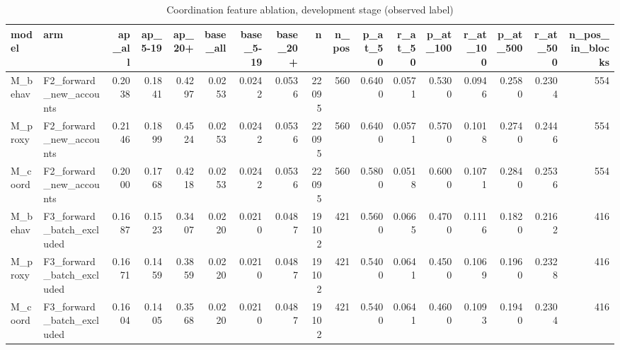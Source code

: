 \begin{table}
\caption{Coordination feature ablation, development stage (observed label)}
\label{tab:tab_coord_ablation}
\begin{tabular}{llrrrrrrrrrrrrrrr}
\toprule
model & arm & ap\_all & ap\_5-19 & ap\_20+ & base\_all & base\_5-19 & base\_20+ & n & n\_pos & p\_at\_50 & r\_at\_50 & p\_at\_100 & r\_at\_100 & p\_at\_500 & r\_at\_500 & n\_pos\_in\_blocks \\
\midrule
M\_behav & F2\_forward\_new\_accounts & 0.2038 & 0.1841 & 0.4297 & 0.0253 & 0.0242 & 0.0536 & 22095 & 560 & 0.6400 & 0.0571 & 0.5300 & 0.0946 & 0.2580 & 0.2304 & 554 \\
M\_proxy & F2\_forward\_new\_accounts & 0.2146 & 0.1899 & 0.4524 & 0.0253 & 0.0242 & 0.0536 & 22095 & 560 & 0.6400 & 0.0571 & 0.5700 & 0.1018 & 0.2740 & 0.2446 & 554 \\
M\_coord & F2\_forward\_new\_accounts & 0.2000 & 0.1768 & 0.4218 & 0.0253 & 0.0242 & 0.0536 & 22095 & 560 & 0.5800 & 0.0518 & 0.6000 & 0.1071 & 0.2840 & 0.2536 & 554 \\
M\_behav & F3\_forward\_batch\_excluded & 0.1687 & 0.1523 & 0.3407 & 0.0220 & 0.0210 & 0.0487 & 19102 & 421 & 0.5600 & 0.0665 & 0.4700 & 0.1116 & 0.1820 & 0.2162 & 416 \\
M\_proxy & F3\_forward\_batch\_excluded & 0.1671 & 0.1459 & 0.3859 & 0.0220 & 0.0210 & 0.0487 & 19102 & 421 & 0.5400 & 0.0641 & 0.4500 & 0.1069 & 0.1960 & 0.2328 & 416 \\
M\_coord & F3\_forward\_batch\_excluded & 0.1604 & 0.1405 & 0.3568 & 0.0220 & 0.0210 & 0.0487 & 19102 & 421 & 0.5400 & 0.0641 & 0.4600 & 0.1093 & 0.1940 & 0.2304 & 416 \\
\bottomrule
\end{tabular}
\end{table}
